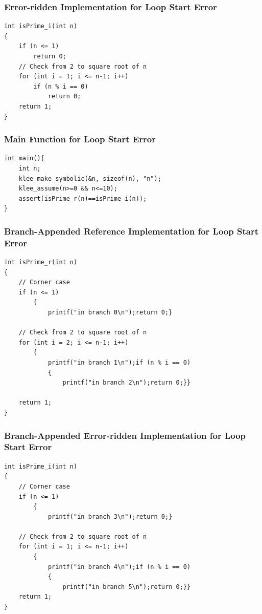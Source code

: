 \subsubsection{Error-ridden Implementation for Loop Start Error}
\begin{verbatim}
int isPrime_i(int n)
{
    if (n <= 1)
        return 0;
    // Check from 2 to square root of n
    for (int i = 1; i <= n-1; i++)
        if (n % i == 0)
            return 0;
    return 1;
}
\end{verbatim}
\subsubsection{Main Function for Loop Start Error}
\begin{verbatim}
int main(){
    int n;
    klee_make_symbolic(&n, sizeof(n), "n");
    klee_assume(n>=0 && n<=10);
    assert(isPrime_r(n)==isPrime_i(n));
}
\end{verbatim}
\subsubsection{Branch-Appended Reference Implementation for Loop Start Error}

\begin{verbatim}
int isPrime_r(int n)
{
    // Corner case
    if (n <= 1)
        {
            printf("in branch 0\n");return 0;}

    // Check from 2 to square root of n
    for (int i = 2; i <= n-1; i++)
        {
            printf("in branch 1\n");if (n % i == 0)
            {
                printf("in branch 2\n");return 0;}}

    return 1;
}
\end{verbatim}

\subsubsection{Branch-Appended Error-ridden Implementation for Loop Start Error}

\begin{verbatim}
int isPrime_i(int n)
{
    // Corner case
    if (n <= 1)
        {
            printf("in branch 3\n");return 0;}

    // Check from 2 to square root of n
    for (int i = 1; i <= n-1; i++)
        {
            printf("in branch 4\n");if (n % i == 0)
            {
                printf("in branch 5\n");return 0;}}
    return 1;
}
\end{verbatim}
